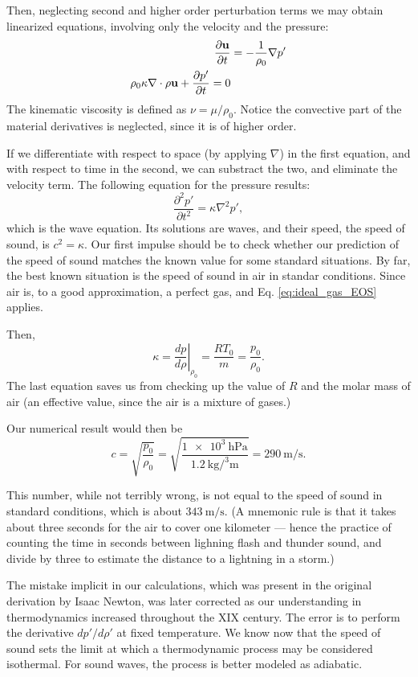 Then, neglecting second and higher order perturbation terms we may
obtain linearized equations, involving only the velocity and the
pressure:
\begin{align}
  \label{eq:sound_lin_cont}
  \frac{\partial \mathbf{u} }{\partial t} & = - \frac{1}{\rho_0} \nabla p' \\
  \rho_0 \kappa \nabla \cdot \mathbf{\rho u} +
  \frac{\partial p'}{\partial t} =0 
\end{align}
The kinematic viscosity is defined as $ \nu=\mu/\rho_0$.%
Notice the convective part of the material derivatives is neglected,
since it is of higher order.

If we differentiate with respect to space (by applying $ \nabla$) in
the first equation, and with respect to time in the second, we can
substract the two, and eliminate the velocity term. 
The following equation for the pressure results:
\[
\frac{\partial^2 p' }{\partial t^2 }  = \kappa \nabla^2 p' ,
\]
which is the wave equation. Its solutions are waves, and their speed,
the speed of sound, is $c^2 = \kappa $. Our first impulse should be to
check whether our prediction of the speed of sound matches the known
value for some standard situations. By far, the best known situation
is the speed of sound in air in standar conditions. Since air is, to a
good approximation, a perfect gas, and Eq. \ref{eq:ideal_gas_EOS}
applies.

Then,
\[
\kappa =  \left. \frac{d p}{d\rho} \right|_{\rho_0} =
 \frac{ R T_0}{m} = \frac{ p_0 }{ \rho_0 } .
\]
The last equation saves us from checking up the value of $R$ and the
molar mass of air (an effective value, since the air is a mixture of
gases.)

Our numerical result would then be
\[
c= \sqrt{\frac{ p_0 }{ \rho_0 }} =
\sqrt{\frac%
  { \SI{1e3}{\hecto\pascal} }%
  {\SI{1.2}{\kilo\gram\per\cubed\meter}}} =
\SI{290}{\meter\per\second} .
\]

This number, while not terribly wrong, is not equal to the speed of
sound in standard conditions, which is about
$\SI{343}{\meter\per\second}$. (A mnemonic rule is that it takes about
three seconds for the air to cover one kilometer --- hence the
practice of counting the time in seconds between lighning flash and
thunder sound, and divide by three to estimate the distance to a
lightning in a storm.)

The mistake implicit in our calculations, which was present in the
original derivation by Isaac Newton, was later corrected as our
understanding in thermodynamics increased throughout the XIX
century. The error is to perform the derivative $d p' / d\rho'$ at
fixed temperature. We know now that the speed of sound sets the limit
at which a thermodynamic process may be considered isothermal. For
sound waves, the process is better modeled as
adiabatic.


